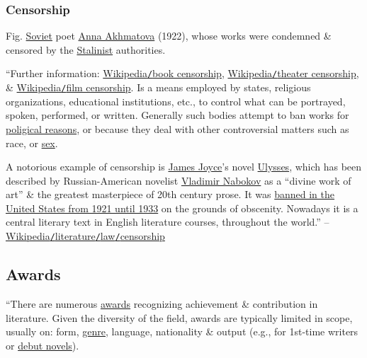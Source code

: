 \documentclass[oneside]{book}
\numberwithin{equation}{section}
\begin{document}
\subsubsection{Censorship}
\textsf{Fig. \href{https://en.wikipedia.org/wiki/Soviet}{Soviet} poet \href{https://en.wikipedia.org/wiki/Anna_Akhmatova}{Anna Akhmatova} (1922), whose works were condemned \& censored by the \href{https://en.wikipedia.org/wiki/Stalin}{Stalinist} authorities.}

``Further information: \href{https://en.wikipedia.org/wiki/Book_censorship}{Wikipedia\texttt{/}book censorship}, \href{https://en.wikipedia.org/wiki/Theatre_censorship}{Wikipedia\texttt{/}theater censorship}, \& \href{https://en.wikipedia.org/wiki/Film_censorship}{Wikipedia\texttt{/}film censorship}. Is a means employed by states, religious organizations, educational institutions, etc., to control what can be portrayed, spoken, performed, or written. Generally such bodies attempt to ban works for \href{https://en.wikipedia.org/wiki/Sedition}{poligical reasons}, or because they deal with other controversial matters such as race, or \href{https://en.wikipedia.org/wiki/Obscenity}{sex}.

A notorious example of censorship is \href{https://en.wikipedia.org/wiki/James_Joyce}{James Joyce}'s novel \href{https://en.wikipedia.org/wiki/Ulysses_(novel)}{Ulysses}, which has been described by Russian-American novelist \href{https://en.wikipedia.org/wiki/Vladimir_Nabokov}{Vladimir Nabokov} as a ``divine work of art'' \& the greatest masterpiece of 20th century prose. It was \href{https://en.wikipedia.org/wiki/Obscenity_trial_of_Ulysses_in_The_Little_Review}{banned in the United States from 1921 until 1933} on the grounds of obscenity. Nowadays it is a central literary text in English literature courses, throughout the world.'' -- \href{https://en.wikipedia.org/wiki/Literature#Censorship}{Wikipedia\texttt{/}literature\texttt{/}law\texttt{/}censorship}

\subsection{Awards}
``There are numerous \href{https://en.wikipedia.org/wiki/Literary_award}{awards} recognizing achievement \& contribution in literature. Given the diversity of the field, awards are typically limited in scope, usually on: form, \href{https://en.wikipedia.org/wiki/Genre}{genre}, language, nationality \& output (e.g., for 1st-time writers or \href{https://en.wikipedia.org/wiki/Debut_novel}{debut novels}).
\end{document}
